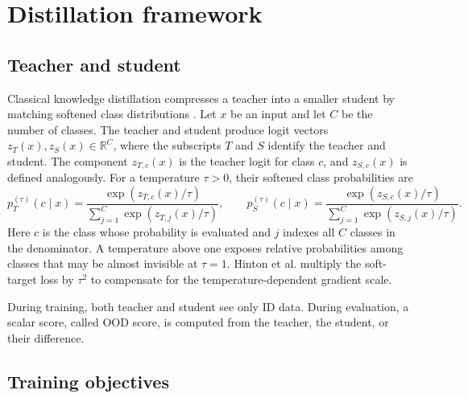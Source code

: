 \section{Distillation framework}

\subsection{Teacher and student}

\headingindent
Classical knowledge distillation compresses a teacher into a smaller student
by matching softened class distributions \cite{hinton2015distilling}. Let $x$
be an input and let $C$ be the number of classes. The teacher and student
produce logit vectors $z_T(x),z_S(x)\in\mathbb R^C$, where the subscripts $T$
and $S$ identify the teacher and student. The component $z_{T,c}(x)$ is the
teacher logit for class $c$, and $z_{S,c}(x)$ is defined analogously. For a
temperature $\tau>0$, their softened class probabilities are
\[
    p_T^{(\tau)}(c\mid x)=\frac{\exp(z_{T,c}(x)/\tau)}
    {\sum_{j=1}^{C}\exp(z_{T,j}(x)/\tau)},\qquad
    p_S^{(\tau)}(c\mid x)=\frac{\exp(z_{S,c}(x)/\tau)}
    {\sum_{j=1}^{C}\exp(z_{S,j}(x)/\tau)}.
\]
Here $c$ is the class whose probability is evaluated and $j$ indexes all
$C$ classes in the denominator. A temperature above one exposes relative
probabilities among classes that may be almost invisible at $\tau=1$. Hinton
et al. multiply the soft-target loss by $\tau^2$ to compensate for the
temperature-dependent gradient scale.

During
training, both teacher and student see only ID data. During evaluation, a scalar score, called OOD score, is
computed from the teacher, the student, or their difference.

\subsection{Training objectives}


